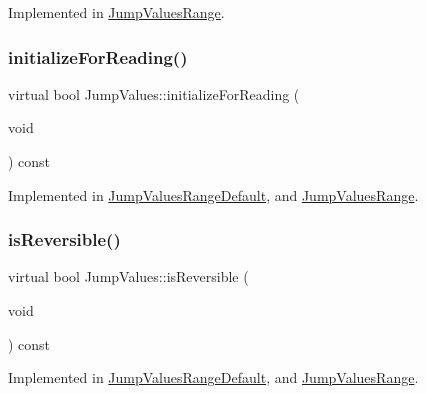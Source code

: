 Implemented in \mbox{\hyperlink{class_jump_values_range_a5da91b687a50616c6a6a65f530c81590}{Jump\+Values\+Range}}.

\mbox{\label{class_jump_values_a9de7071bd67d3507636128fe2c537f71}} 
\subsubsection{\texorpdfstring{initializeForReading()}{initializeForReading()}}
{\footnotesize\ttfamily virtual bool Jump\+Values\+::initialize\+For\+Reading (\begin{DoxyParamCaption}\item[{void}]{ }\end{DoxyParamCaption}) const\hspace{0.3cm}{\ttfamily [pure virtual]}}



Implemented in \mbox{\hyperlink{class_jump_values_range_default_aa179eae73d98e8ce8f7fee639ef078ae}{Jump\+Values\+Range\+Default}}, and \mbox{\hyperlink{class_jump_values_range_a92e0970fd19cd188a82078752a10948d}{Jump\+Values\+Range}}.

\mbox{\label{class_jump_values_a7cd231f94b261ef9a426619cae01d764}} 
\subsubsection{\texorpdfstring{isReversible()}{isReversible()}}
{\footnotesize\ttfamily virtual bool Jump\+Values\+::is\+Reversible (\begin{DoxyParamCaption}\item[{void}]{ }\end{DoxyParamCaption}) const\hspace{0.3cm}{\ttfamily [pure virtual]}}



Implemented in \mbox{\hyperlink{class_jump_values_range_default_ae8a65769bf7dbc7f257725c4cf755aa9}{Jump\+Values\+Range\+Default}}, and \mbox{\hyperlink{class_jump_values_range_adeedbb8db9a84ff0422e61dcb76848fe}{Jump\+Values\+Range}}.

\mbox{\label{class_jump_values_a2533b15a8ced06d9785f3a20164c1ec8}} 
